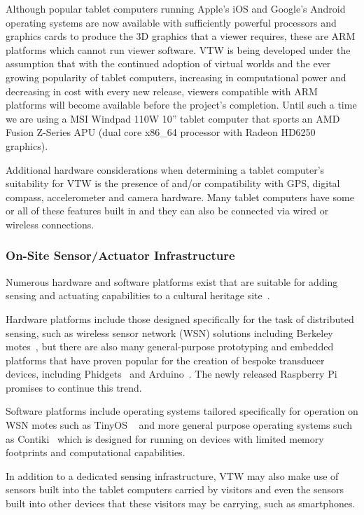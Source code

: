 \documentclass{sig-alternate}
\begin{document}
{Although popular tablet computers running Apple's iOS and Google's Android operating systems are now available with sufficiently powerful processors and graphics cards to produce the 3D graphics that a viewer requires, these are ARM platforms which cannot run viewer software. VTW is being developed under the assumption that with the continued adoption of virtual worlds and the ever growing popularity of tablet computers, increasing in computational power and decreasing in cost with every new release, viewers compatible with ARM platforms will become available before the project's completion. Until such a time we are using a MSI Windpad 110W 10'' tablet computer that sports an AMD Fusion Z-Series APU (dual core x86\_64 processor with Radeon HD6250 graphics).

Additional hardware considerations when determining a tablet computer's suitability for VTW is the presence of and/or compatibility with GPS, digital compass, accelerometer and camera hardware. Many tablet computers have some or all of these features built in and they can also be connected via wired or wireless connections.

\subsubsection{On-Site Sensor/Actuator Infrastructure}
Numerous hardware and software platforms exist that are suitable for adding sensing and actuating capabilities to a cultural heritage site~\cite{Bose2009}.

Hardware platforms include those designed specifically for the task of distributed sensing, such as wireless sensor network (WSN) solutions including Berkeley motes~\cite{Bose2009}, but there are also many general-purpose prototyping and embedded platforms that have proven popular for the creation of bespoke transducer devices, including Phidgets~\cite{Faludi2010, PhidgetsInc.} and Arduino~\cite{Faludi2010, Arduino}. The newly released Raspberry Pi~\cite{Foundation} promises to continue this trend.

Software platforms include operating systems tailored specifically for operation on WSN motes such as TinyOS ~\cite{TinyOSAlliance} and more general purpose operating systems such as Contiki~\cite{Dunkels} which is designed for running on devices with limited memory footprints and computational capabilities.

In addition to a dedicated sensing infrastructure, VTW may also make use of sensors built into the tablet computers carried by visitors and even the sensors built into other devices that these visitors may be carrying, such as smartphones.

}
\end{document}
